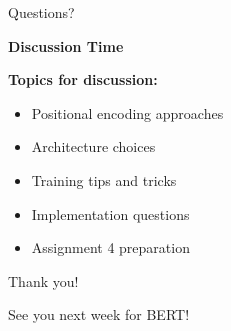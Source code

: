 \documentclass[aspectratio=169]{beamer}
\begin{document}
\begin{frame}{Questions? 🙋}
\begin{center}
\LARGE
\textbf{Discussion Time}
\end{center}

\vspace{1em}

\textbf{Topics for discussion:}
\begin{itemize}\setlength{\itemsep}{0pt}
    \item Positional encoding approaches
    \item Architecture choices
    \item Training tips and tricks
    \item Implementation questions
    \item Assignment 4 preparation
\end{itemize}

\vspace{1em}

\begin{center}
\Large
Thank you! 🙏

\vspace{1em}

See you next week for BERT!
\end{center}
\end{frame}
\end{document}

